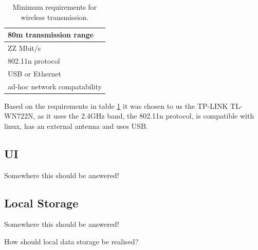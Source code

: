 \begin{table}[]
\centering
\caption{Minimum requirements for wireless transmission.}
\label{tab:req_wifi}
\begin{tabular}{|l|}
\hline
80m transmission range       \\ \hline
ZZ Mbit/s                    \\ \hline
802.11n protocol             \\ \hline
USB or Ethernet              \\ \hline
ad-hoc network compatability \\ \hline
\end{tabular}
\end{table}
Based on the requirements in table \ref{tab:req_wifi} it was chosen to us the TP-LINK TL-WN722N, as it uses the 2.4GHz band, the 802.11n protocol, is compatible with linux, has an external antenna and uses USB. 






















\subsection{UI}
Somewhere this should be answered!












\subsection{Local Storage}
Somewhere this should be answered!

How should local data storage be realised?

	


